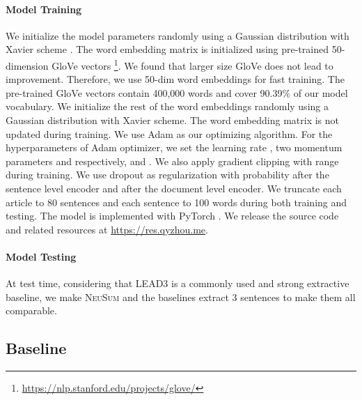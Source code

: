 \documentclass[11pt,a4paper]{article}
\newcommand{\ourModelName}{\textsc{NeuSum}}
\begin{document}
\paragraph{Model Training}
We initialize the model parameters randomly using a Gaussian distribution with Xavier scheme \citep{glorot2010understanding}.
The word embedding matrix is initialized using pre-trained 50-dimension GloVe vectors \citep{pennington2014glove}\footnote{\url{https://nlp.stanford.edu/projects/glove/}}.
We found that larger size GloVe does not lead to improvement. Therefore, we use 50-dim word embeddings for fast training. 
The pre-trained GloVe vectors contain 400,000 words and cover 90.39\% of our model vocabulary.
We initialize the rest of the word embeddings randomly using a Gaussian distribution with Xavier scheme.
The word embedding matrix is not updated during training.
We use Adam \citep{kingma2014adam} as our optimizing algorithm.
For the hyperparameters of Adam optimizer, we set the learning rate , two momentum parameters  and  respectively, and .
We also apply gradient clipping \citep{pascanu2013difficulty} with range  during training.
We use dropout \citep{srivastava2014dropout} as regularization with probability  after the sentence level encoder and  after the document level encoder.
We truncate each article to 80 sentences and each sentence to 100 words during both training and testing.
The model is implemented with PyTorch \citep{paszke2017automatic}.
We release the source code and related resources at \url{https://res.qyzhou.me}.

\paragraph{Model Testing}
At test time, considering that \textsc{LEAD3} is a commonly used and strong extractive baseline,  we make \ourModelName{} and the baselines extract 3 sentences to make them all comparable.

\subsection{Baseline}
\end{document}
